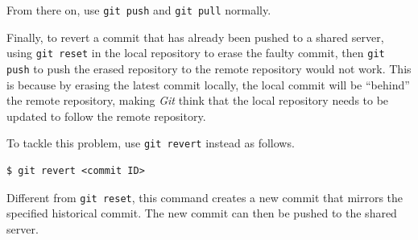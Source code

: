 From there on, use \verb|git push| and \verb|git pull| normally.

Finally, to revert a commit that has already been pushed to a shared server, using \verb|git reset| in the local repository to erase the faulty commit, then \verb|git push| to push the erased repository to the remote repository would not work. This is because by erasing the latest commit locally, the local commit will be ``behind'' the remote repository, making \textit{Git} think that the local repository needs to be updated to follow the remote repository.

To tackle this problem, use \verb|git revert| instead as follows.
\begin{lstlisting}
$ git revert <commit ID>
\end{lstlisting}
Different from \verb|git reset|, this command creates a new commit that mirrors the specified historical commit. The new commit can then be pushed to the shared server.













